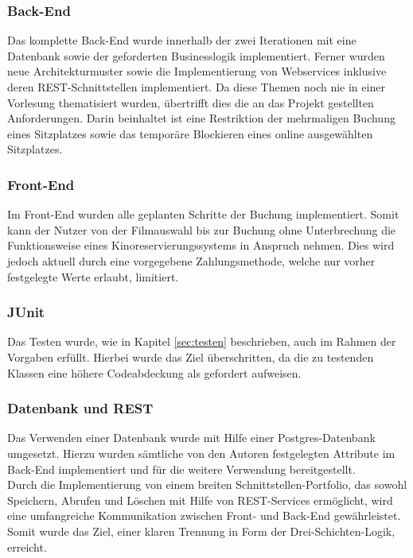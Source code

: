 \subsubsection*{Back-End}
Das komplette Back-End wurde innerhalb der zwei Iterationen mit eine Datenbank sowie der geforderten Businesslogik implementiert.
Ferner wurden neue Architekturmuster sowie die Implementierung von Webservices inklusive deren \acs{REST}-Schnittstellen implementiert.
Da diese Themen noch nie in einer Vorlesung thematisiert wurden, übertrifft dies die an das Projekt gestellten Anforderungen.
Darin beinhaltet ist eine Restriktion der mehrmaligen Buchung eines Sitzplatzes sowie das temporäre Blockieren eines online ausgewählten Sitzplatzes.

\subsubsection*{Front-End}
Im Front-End wurden alle geplanten Schritte der Buchung implementiert.
Somit kann der Nutzer von der Filmauswahl bis zur Buchung ohne Unterbrechung die Funktionsweise eines Kinoreservierungssystems in Anspruch nehmen.
Dies wird jedoch aktuell durch eine vorgegebene Zahlungsmethode, welche nur vorher festgelegte Werte erlaubt, limitiert.

\subsubsection*{JUnit}
Das Testen wurde, wie in Kapitel \vref{sec:testen} beschrieben, auch im Rahmen der Vorgaben erfüllt.
Hierbei wurde das Ziel überschritten, da die zu testenden Klassen eine höhere Codeabdeckung als gefordert aufweisen.

\subsubsection*{Datenbank und \acf{REST}}
Das Verwenden einer Datenbank wurde mit Hilfe einer Postgres-Datenbank umgesetzt.
Hierzu wurden sämtliche von den Autoren festgelegten Attribute im Back-End implementiert und für die weitere Verwendung bereitgestellt. \\
Durch die Implementierung von einem breiten Schnittstellen-Portfolio, das sowohl Speichern, Abrufen und Löschen mit Hilfe von \acs{REST}-Services ermöglicht, wird eine umfangreiche Kommunikation zwischen Front- und Back-End gewährleistet. \\
Somit wurde das Ziel, einer klaren Trennung in Form der Drei-Schichten-Logik, erreicht.

